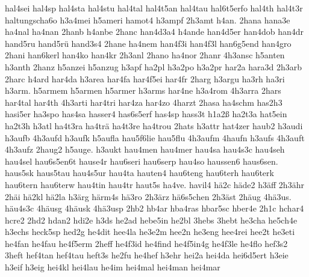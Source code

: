 {    hal4sei
    hal4sp
    hal4sta
    hal4stu
    hal4tal
    hal4t5an
    hal4tau
    hal6t5erfo
    hal4th
    hal4t3r
    haltungscha6o
    h3a4mei
    h5ameri
    hamot4
    h3ampf
    2h3amt
    h4an.
    2hana
    hana3e
    ha4nal
    ha4nan
    2hanb
    h4anbe
    2hanc
    han4d3a4
    h4ande
    han4d5er
    han4dob
    han4dr
    hand5ru
    hand5rü
    hand3s4
    2hane
    ha4nem
    han4f3i
    han4f3l
    han6g5end
    han4gro
    2hani
    han6kerl
    han4ko
    han4kr
    2h3anl
    2hano
    ha4nor
    2hanr
    4h3ansc
    h5anten
    h3anth
    2hanz
    h5anzei
    h5anzug
    h3apf
    ha2pl
    h3a2po
    h3a2pr
    har2a
    hara3d
    2h3arb
    2harc
    h4ard
    har4da
    h3area
    har4fa
    har4f5ei
    har4fr
    2harg
    h3argu
    ha3rh
    ha3ri
    h3arm.
    h5armem
    h5armen
    h5armer
    h3arms
    har4ne
    h3a4rom
    4h3arra
    2hars
    har4tal
    har4th
    4h3arti
    har4tri
    har4za
    har4zo
    4harzt
    2hasa
    ha4schm
    has2h3
    hasi5er
    ha3spo
    has4sa
    hasser4
    has6s5erf
    has4sp
    hass3t
    h1a2ß
    ha2t3a
    hat5ein
    ha2t3h
    h3atl
    ha4t3ra
    ha4trä
    ha4t3re
    ha4trou
    2hats
    h3attr
    hat4zer
    haub2
    h3audi
    h3aufb
    4h3aufd
    h3aufk
    h5aufla
    hau5f6lie
    hau5flu
    4h3aufm
    4haufn
    h3aufs
    4h3auft
    4h3aufz
    2haug2
    h5auge.
    h3aukt
    hau4men
    hau4mer
    hau4sa
    hau4s3c
    hau4seh
    hau4sel
    hau6s5en6t
    hause4r
    hau6seri
    hau6serp
    hau4so
    haussen6
    haus6sen.
    haus5sk
    haus5tau
    hau4s5ur
    hau4ta
    hauten4
    hau6teng
    hau6terh
    hau6terk
    hau6tern
    hau6terw
    hau4tin
    hau4tr
    haut5s
    ha4ve.
    havil4
    hä2c
    häde2
    h3äff
    2h3ähr
    2häi
    hä2kl
    hä2la
    h3ärg
    härm4s
    hä3ro
    2h3ärz
    hä6s5chen
    2h3äst
    2häug
    4hä3us.
    häu4s3c
    4häusg
    4häusk
    4hä3usp
    2hb2
    hb4ar
    hba4ras
    hbar5sc
    hber4e
    2h1c
    hchar4
    hcre2
    2hd2
    hdan2
    hdi2e
    h3ds
    he2ad
    hebe5in
    he2bl
    3hebs
    3hebt
    he3cha
    he5ch4e
    h3echs
    heck5sp
    hed2g
    he4dit
    hee4la
    he3e2m
    hee2n
    he3eng
    hee4rei
    hee2t
    he3eti
    he4fan
    he4fau
    he4f5erm
    2heff
    he4f3id
    he4find
    he4f5in4g
    he4f3le
    he4flo
    hef3s2
    3heft
    hef4tan
    hef4tau
    heft3s
    he2fu
    he4hef
    h3ehr
    hei2a
    hei4da
    hei6d5ert
    h3eie
    h3eif
    h3eig
    hei4kl
    hei4lau
    he4im
    hei4mal
    hei4man
    hei4mar
}
